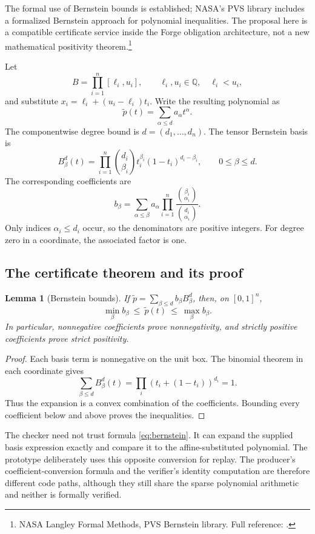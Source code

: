 \documentclass[11pt,letterpaper]{article}
\newcommand{\Forge}{\textsf{Forge}}
\newcommand{\Q}{\mathbb{Q}}
\newcommand{\src}[2]{\footnote{#2. Full reference: \cite{#1}.}}
\newtheorem{lemma}[proposition]{Lemma}
\theoremstyle{definition}
\theoremstyle{remark}
\begin{document}
The formal use of Bernstein bounds is established; NASA's PVS library includes a formalized Bernstein approach for polynomial inequalities. The proposal here is a compatible certificate service inside the \Forge{} obligation architecture, not a new mathematical positivity theorem.\src{bernsteinref}{NASA Langley Formal Methods, PVS Bernstein library}

Let
\[
B=\prod_{i=1}^{n}[\ell_i,u_i],\qquad \ell_i,u_i\in\Q,\quad\ell_i<u_i,
\]
and substitute $x_i=\ell_i+(u_i-\ell_i)t_i$. Write the resulting polynomial as
\[
\widetilde p(t)=\sum_{\alpha\leq d}a_\alpha t^\alpha.
\]
The componentwise degree bound is $d=(d_1,\ldots,d_n)$. The tensor Bernstein basis is
\[
B_\beta^d(t)=\prod_{i=1}^{n}\binom{d_i}{\beta_i}
 t_i^{\beta_i}(1-t_i)^{d_i-\beta_i},\qquad 0\leq\beta\leq d.
\]
The corresponding coefficients are
\begin{equation}\label{eq:bernstein}
b_\beta=\sum_{\alpha\leq\beta}a_\alpha
\prod_{i=1}^{n}\frac{\binom{\beta_i}{\alpha_i}}{\binom{d_i}{\alpha_i}}.
\end{equation}
Only indices $\alpha_i\leq d_i$ occur, so the denominators are positive integers. For degree zero in a coordinate, the associated factor is one.

\subsection{The certificate theorem and its proof}
\begin{lemma}[Bernstein bounds]
If $\widetilde p=\sum_{\beta\leq d}b_\beta B_\beta^d$, then, on $[0,1]^n$,
\[
\min_\beta b_\beta\ \leq\ \widetilde p(t)\ \leq\ \max_\beta b_\beta.
\]
In particular, nonnegative coefficients prove nonnegativity, and strictly positive coefficients prove strict positivity.
\end{lemma}
\begin{proof}
Each basis term is nonnegative on the unit box. The binomial theorem in each coordinate gives
\[
\sum_{\beta\leq d}B_\beta^d(t)
=\prod_i(t_i+(1-t_i))^{d_i}=1.
\]
Thus the expansion is a convex combination of the coefficients. Bounding every coefficient below and above proves the inequalities.
\end{proof}
The checker need not trust formula \eqref{eq:bernstein}. It can expand the supplied basis expression exactly and compare it to the affine-substituted polynomial. The prototype deliberately uses this opposite conversion for replay. The producer's coefficient-conversion formula and the verifier's identity computation are therefore different code paths, although they still share the sparse polynomial arithmetic and neither is formally verified.
\end{document}
